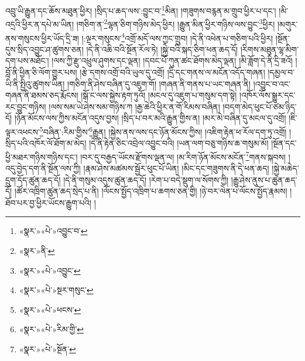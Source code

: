 འབྲུ་ཡི་རྒྱུན་དང་ཆོས་མཐུན་ཕྱིར། །སྲིད་པ་ཆད་ལས་:བྱུང་བ་\footnote{«སྣར་»«པེ་»འབྱུང་བ་}མིན། །གཟུགས་བརྙན་མ་གྲུབ་ཕྱིར་པ་དང་། །མི་འདྲའི་ཕྱིར་ན་དཔེ་མ་ཡིན། །གཅིག་ན་\footnote{«སྣར་»ནི་}ལྷན་ཅིག་གཉིས་མེད་ཕྱིར། །རྒྱུན་མིན་ཕྱིར་གཉིས་ལས་བྱུང་\footnote{«སྣར་»«པེ་»འབྱུང་}ཕྱིར། །མགུར་ནས་གསུངས་ཕྱིར་ཡོད་དྲི་ཟ། །:ལྔར་གསུངས་\footnote{«སྣར་»«པེ་»སྔར་གསུང་}འགྲོ་མདོ་ལས་ཀྱང་གྲུབ། །དེ་ནི་འཕེན་པ་གཅིག་པའི་ཕྱིར། །སྔོན་དུས་སྲིད་འབྱུང་ཤ་ཚུགས་ཅན། །དེ་ནི་འཆི་བའི་སྔོན་རོལ་ཏེ། །སྐྱེ་བའི་སྐད་ཅིག་ཕན་ཆད་དོ། །རིགས་མཐུན་ལྷ་མིག་དག་པས་མཐོང་། །ལས་ཀྱི་རྫུ་འཕྲུལ་ཤུགས་དང་ལྡན། །དབང་པོ་ཀུན་ཚང་ཐོགས་མེད་ལྡན། །མི་ཟློག་དེ་ནི་དྲི་ཟའོ། །བློ་ནི་ཕྱིན་ཅི་ལོག་གྱུར་པས། །རྩེ་དགས་འགྲོ་བའི་ཡུལ་དུ་འགྲོ། །དྲི་དང་གནས་ལ་མངོན་འདོད་གཞན། །དམྱལ་བ་ཡི་ནི་སྤྱིའུ་ཚུགས་ཡིན། །གཅིག་ནི་ཤེས་བཞིན་དུ་འཇུག་གོ། །གཞན་ནི་གནས་པ་ཡང་གཞན་ནི། །འབྱུང་བ་འང་གཞན་ནི་ཐམས་ཅད་རྨོངས། །སྒོ་ང་ལས་སྐྱེས་རྟག་ཏུའོ། །མངལ་དུ་འཇུག་པ་གསུམ་དག་སྟེ། །འཁོར་ལོས་སྒྱུར་དང་རང་བྱུང་གཉིས། །ལས་སམ་ཡེ་ཤེས་སམ་གཉིས་ཀ །རྒྱ་ཆེའི་ཕྱིར་ན་གོ་རིམས་བཞིན། །བདག་མེད་ཕུང་པོ་ཙམ་ཉིད་དོ། །ཉོན་མོངས་ལས་ཀྱིས་མངོན་འདུས་བྱས། །སྲིད་པ་བར་མའི་རྒྱུན་གྱིས་ན། །མར་མེ་བཞིན་དུ་མངལ་དུ་འགྲོ། །ཇི་ལྟར་འཕངས་\footnote{«སྣར་»«པེ་»ཕངས་}བཞིན་:རིམ་གྱིས་\footnote{«སྣར་»«པེ་»རིམ་གྱི་}རྒྱུན། །སྐྱེས་ནས་ལས་དང་ཉོན་མོངས་ཀྱིས། །འཇིག་རྟེན་ཕ་རོལ་དག་ཏུ་འགྲོ། །སྲིད་པའི་འཁོར་ལོ་ཐོག་མ་མེད། །དེ་ནི་རྟེན་ཅིང་འབྲེལ་འབྱུང་བའི། །ཡན་ལག་བཅུ་གཉིས་ཆ་གསུམ་མོ། །སྔོན་དང་ཕྱི་མཐར་གཉིས་གཉིས་དང་། །བར་དུ་བརྒྱད་ཡོངས་རྫོགས་ལྡན་ལ། །མ་རིག་ཉོན་མོངས་མངོན་\footnote{«སྣར་»«པེ་»སྔོན་}གནས་སྐབས། །འདུ་བྱེད་དག་ནི་སྔོན་ལས་ཀྱི། །རྣམ་ཤེས་མཚམས་སྦྱོར་ཕུང་པོ་ཡིན། །མིང་དང་གཟུགས་ནི་དེ་ཕན་ཆད། །སྐྱེ་མཆེད་དྲུག་དོད་ཚུན་ཆད་དོ། །དེ་ནི་གསུམ་འདུས་ཚུན་ཆད་དོ། །རེག་པ་བདེ་སྡུག་ལ་སོགས་ཀྱི། །རྒྱུ་ཤེས་ནུས་པ་ཚུན་ཆད་དོ། །ཚོར་འཁྲིག་ཚུན་ཆད་སྲེད་པ་ནི། །ལོངས་སྤྱོད་འཁྲིག་པ་ཆགས་ཅན་གྱི། །ཉེ་བར་ལེན་པ་ལོངས་སྤྱོད་རྣམས། །ཐོབ་པར་བྱ་ཕྱིར་ཡོངས་རྒྱུག་པའི། །
